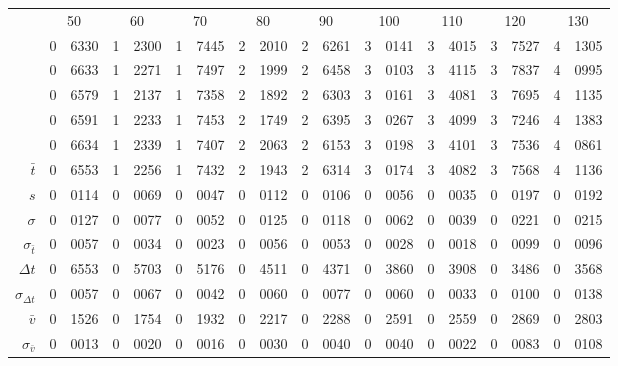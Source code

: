 \begin{tabular}{r *9{r@{.}l}}
 &\multicolumn{2}{c}{50}
&\multicolumn{2}{c}{60}
&\multicolumn{2}{c}{70}
&\multicolumn{2}{c}{80}
&\multicolumn{2}{c}{90}
&\multicolumn{2}{c}{100}
&\multicolumn{2}{c}{110}
&\multicolumn{2}{c}{120}
&\multicolumn{2}{c}{130}\\[3 pt]
  &0&6330 &1&2300 &1&7445 &2&2010 &2&6261 &3&0141 &3&4015 &3&7527 &4&1305\\
  &0&6633 &1&2271 &1&7497 &2&1999 &2&6458 &3&0103 &3&4115 &3&7837 &4&0995\\
  &0&6579 &1&2137 &1&7358 &2&1892 &2&6303 &3&0161 &3&4081 &3&7695 &4&1135\\
  &0&6591 &1&2233 &1&7453 &2&1749 &2&6395 &3&0267 &3&4099 &3&7246 &4&1383\\
  &0&6634 &1&2339 &1&7407 &2&2063 &2&6153 &3&0198 &3&4101 &3&7536 &4&0861\\[3 pt]
$\bar{t}$&0&6553 &1&2256 &1&7432 &2&1943 &2&6314 &3&0174 &3&4082 &3&7568 &4&1136\\
$s$&0&0114 &0&0069 &0&0047 &0&0112 &0&0106 &0&0056 &0&0035 &0&0197 &0&0192\\
$\sigma$&0&0127 &0&0077 &0&0052 &0&0125 &0&0118 &0&0062 &0&0039 &0&0221 &0&0215\\
$\sigma_{\bar{t}}$&0&0057 &0&0034 &0&0023 &0&0056 &0&0053 &0&0028 &0&0018 &0&0099 &0&0096\\[3 pt]
$\Delta t$&0&6553 &0&5703 &0&5176 &0&4511 &0&4371 &0&3860 &0&3908 &0&3486 &0&3568\\
$\sigma_{\Delta t}$&0&0057 &0&0067 &0&0042 &0&0060 &0&0077 &0&0060 &0&0033 &0&0100 &0&0138\\
$\bar{v}$&0&1526 &0&1754 &0&1932 &0&2217 &0&2288 &0&2591 &0&2559 &0&2869 &0&2803\\
$\sigma_{\bar{v}}$ &0&0013 &0&0020 &0&0016 &0&0030 &0&0040 &0&0040 &0&0022 &0&0083 &0&0108
\end{tabular}